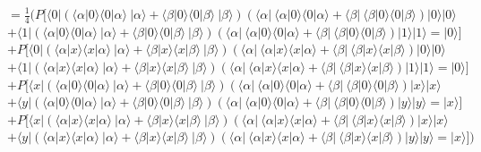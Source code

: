 \documentclass[a4paper]{scrartcl}
\begin{document}
\begin{enumerate}[a)]
$=\frac{1}{4} (P[ \langle 0|(\langle \alpha|0\rangle \langle 0|\alpha\rangle~|\alpha\rangle + \langle \beta|0\rangle \langle 0|\beta\rangle~|\beta\rangle) (\langle \alpha|~\langle \alpha|0\rangle \langle 0|\alpha\rangle + \langle \beta|~\langle \beta|0\rangle \langle 0|\beta\rangle)|0\rangle |0\rangle$\\
$+ \langle 1|(\langle \alpha|0\rangle \langle 0|\alpha\rangle~|\alpha\rangle + \langle \beta|0\rangle \langle 0|\beta\rangle~|\beta\rangle) (\langle \alpha|~\langle \alpha|0\rangle \langle 0|\alpha\rangle + \langle \beta|~\langle \beta|0\rangle \langle 0|\beta\rangle)|1\rangle |1\rangle =|0\rangle]$\\
$+P[ \langle 0|(\langle \alpha|x\rangle \langle x|\alpha\rangle~|\alpha\rangle + \langle \beta|x\rangle \langle x|\beta\rangle~|\beta\rangle) (\langle \alpha|~\langle \alpha|x\rangle \langle x|\alpha\rangle + \langle \beta|~\langle \beta|x\rangle \langle x|\beta\rangle)|0\rangle |0\rangle$\\
$+ \langle 1|(\langle \alpha|x\rangle \langle x|\alpha\rangle~|\alpha\rangle + \langle \beta|x\rangle \langle x|\beta\rangle~|\beta\rangle) (\langle \alpha|~\langle \alpha|x\rangle \langle x|\alpha\rangle + \langle \beta|~\langle \beta|x\rangle \langle x|\beta\rangle)|1\rangle |1\rangle =|0\rangle]$\\
$+ P[ \langle x|(\langle \alpha|0\rangle \langle 0|\alpha\rangle~|\alpha\rangle + \langle \beta|0\rangle \langle 0|\beta\rangle~|\beta\rangle) (\langle \alpha|~\langle \alpha|0\rangle \langle 0|\alpha\rangle + \langle \beta|~\langle \beta|0\rangle \langle 0|\beta\rangle)|x\rangle |x\rangle$\\
$+ \langle y|(\langle \alpha|0\rangle \langle 0|\alpha\rangle~|\alpha\rangle + \langle \beta|0\rangle \langle 0|\beta\rangle~|\beta\rangle) (\langle \alpha|~\langle \alpha|0\rangle \langle 0|\alpha\rangle + \langle \beta|~\langle \beta|0\rangle \langle 0|\beta\rangle)|y\rangle |y\rangle =|x\rangle]$\\
$+P[ \langle x|(\langle \alpha|x\rangle \langle x|\alpha\rangle~|\alpha\rangle + \langle \beta|x\rangle \langle x|\beta\rangle~|\beta\rangle) (\langle \alpha|~\langle \alpha|x\rangle \langle x|\alpha\rangle + \langle \beta|~\langle \beta|x\rangle \langle x|\beta\rangle)|x\rangle |x\rangle$\\
$+ \langle y|(\langle \alpha|x\rangle \langle x|\alpha\rangle~|\alpha\rangle + \langle \beta|x\rangle \langle x|\beta\rangle~|\beta\rangle) (\langle \alpha|~\langle \alpha|x\rangle \langle x|\alpha\rangle + \langle \beta|~\langle \beta|x\rangle \langle x|\beta\rangle)|y\rangle |y\rangle =|x\rangle])$\\


\end{enumerate}
\end{document}
